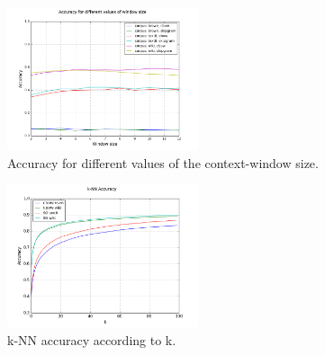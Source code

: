 \documentclass[conference]{IEEEtran}
\begin{document}
\begin{figure}[t]
\centering
\includegraphics[width=0.5\textwidth]{graph_acc_window}
\caption{Accuracy for different values of the context-window size. }
\label{fig:window}
\end{figure}

\begin{figure}[t]
\centering
\includegraphics[width=0.5\textwidth]{graph_knn-acc}
\caption{k-NN accuracy according to k.}
\label{fig:knn}
\end{figure}

\label{sec:res}


%
%
\end{document}
